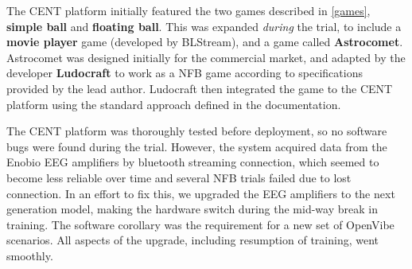 The CENT platform initially featured the two games described in \ref{games}, \textbf{simple ball} and \textbf{floating ball}. This was expanded \textit{during} the trial, to include a \textbf{movie player} game (developed by BLStream), and a game called \textbf{Astrocomet}. Astrocomet was designed initially for the commercial market, and adapted by the developer \textbf{Ludocraft} to work as a NFB game according to specifications provided by the lead author. Ludocraft then integrated the game to the CENT platform using the standard approach defined in the documentation.

The CENT platform was thoroughly tested before deployment, so no software bugs were found during the trial. However, the system acquired data from the Enobio EEG amplifiers by bluetooth streaming connection, which seemed to become less reliable over time and several NFB trials failed due to lost connection. In an effort to fix this, we upgraded the EEG amplifiers to the next generation model, making the hardware switch during the mid-way break in training. The software corollary was the requirement for a new set of OpenVibe scenarios. All aspects of the upgrade, including resumption of training, went smoothly.